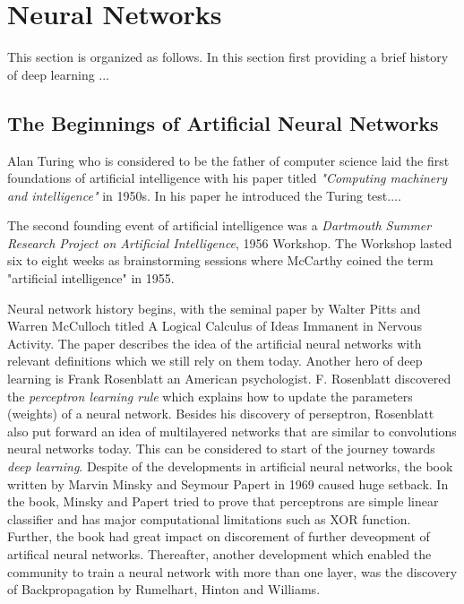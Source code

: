 \setcounter{secnumdepth}{4}
\section{Neural Networks}  \label{cha:foundations_basics_nn}
This section is organized as follows. In this section first providing a brief history of deep learning ...
\subsection{The Beginnings of Artificial Neural Networks}
Alan Turing who is considered to be the father of computer science laid  the first foundations of artificial intelligence with his paper titled \textit{"Computing machinery and intelligence"} in 1950s. In his paper he introduced the Turing test....   

The second founding event of artificial intelligence was a \textit{Dartmouth Summer Research Project on Artificial Intelligence}, 1956 Workshop. The Workshop lasted six to eight weeks as brainstorming sessions where McCarthy coined the term "artificial intelligence" in 1955.

Neural network history begins, with the seminal paper by Walter Pitts and Warren McCulloch titled A Logical Calculus of Ideas Immanent in Nervous Activity. The paper describes the idea of the artificial neural networks with relevant definitions which we still rely on them today. Another hero of deep learning is Frank Rosenblatt an American psychologist. F. Rosenblatt discovered the \textit{perceptron learning rule} which explains how to update the parameters (weights) of a neural network. Besides his discovery of perseptron,  Rosenblatt also put forward an idea of multilayered networks that are similar to convolutions neural networks today. This can be considered to start of the journey towards \textit{deep learning}. Despite of the developments in artificial neural networks,  the book written by Marvin Minsky and Seymour Papert in 1969 caused huge setback. In the book, Minsky and Papert tried to prove that perceptrons are simple linear classifier and has major computational limitations such as XOR function. Further, the book had great impact on discorement of further deveopment of artifical neural networks. Thereafter, another development which enabled the community to train a neural network with more than one layer, was the discovery of Backpropagation by Rumelhart, Hinton and Williams. 

